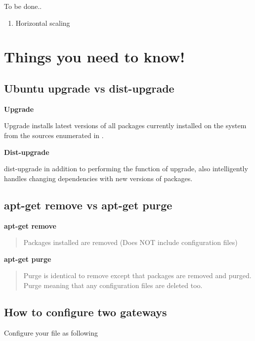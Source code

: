 \documentclass[letterpaper,10pt,english]{sphinxmanual}
\begin{document}
To be done..
\begin{enumerate}
\item {} 
Horizontal scaling

\end{enumerate}


\chapter{Things you need to know!}
\label{_source/things_you_need_to_know::doc}\label{_source/things_you_need_to_know:things-you-need-to-know}

\section{Ubuntu upgrade vs dist-upgrade}
\label{_source/things/upgrade_vs_dist-upgrade:ubuntu-upgrade-vs-dist-upgrade}\label{_source/things/upgrade_vs_dist-upgrade::doc}
\textbf{Upgrade}

Upgrade installs latest versions of all packages currently installed on the system from the sources enumerated in .

\textbf{Dist-upgrade}

dist-upgrade in addition to performing the function of upgrade, also intelligently handles changing dependencies with new versions of packages.


\section{apt-get remove vs apt-get purge}
\label{_source/things/remove_vs_purge::doc}\label{_source/things/remove_vs_purge:apt-get-remove-vs-apt-get-purge}
\textbf{apt-get remove}
\begin{quote}

Packages installed are removed (Does NOT include configuration files)
\end{quote}

\textbf{apt-get purge}
\begin{quote}

Purge is identical to remove except that packages are removed and purged. Purge meaning that any configuration files are deleted too.
\end{quote}


\section{How to configure two gateways}
\label{_source/things/two_gateways:how-to-configure-two-gateways}\label{_source/things/two_gateways::doc}
Configure your  file as following
\end{document}

